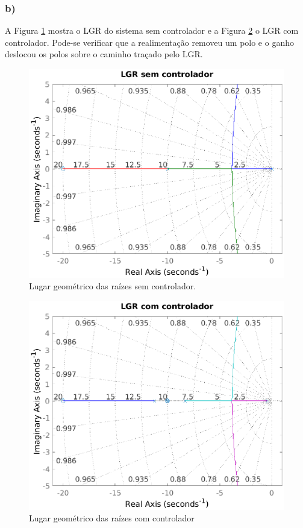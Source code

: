 \newpage
\subsubsection*{b)}

    A Figura \ref{fig:LGR3Bsem} mostra o LGR do sistema sem controlador e a Figura \ref{fig:LGR3Bcom} o 
    LGR com controlador. Pode-se verificar que a realimentação removeu um polo e o ganho deslocou os polos 
    sobre o caminho traçado pelo LGR.


    \begin{figure}[!ht]
        \centering
        \includegraphics[width = 0.75\linewidth]{Figuras/ProblemasPI/Problema3/LGRsemControlador.eps}
        \caption{Lugar geométrico das raízes sem controlador.}
        \label{fig:LGR3Bsem}                   
    \end{figure}

    \begin{figure}[!ht]
        \centering
        \includegraphics[width = 0.75\linewidth]{Figuras/ProblemasPI/Problema3/LGRcomControlador.eps}
        \caption{Lugar geométrico das raízes com controlador}
        \label{fig:LGR3Bcom}                   
    \end{figure}

